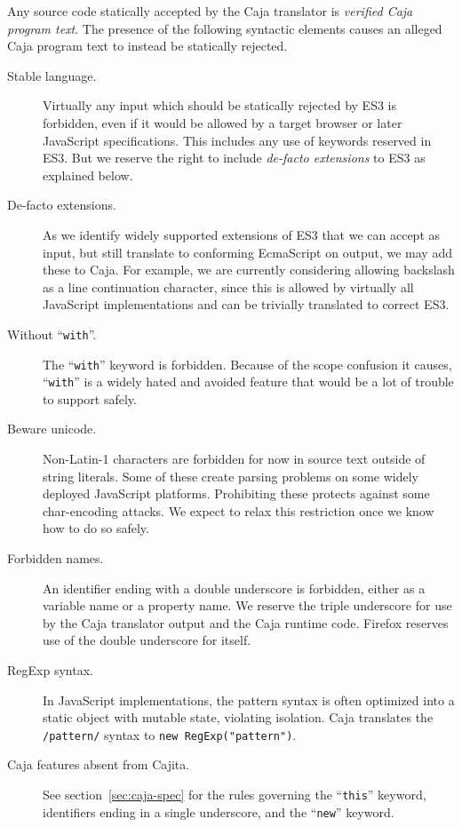 \documentclass[letterpaper,twocolumn,10pt]{article}
\newcommand{\code}[1]{{\tt {#1}}}              %
\begin{document}
Any source code statically accepted by the Caja translator is \emph{verified 
Caja program text}. The presence of the following syntactic elements causes 
an alleged Caja program text to instead be statically rejected.

\begin{description}

    \item[Stable language.] Virtually any input which should be statically 
    rejected by ES3 is forbidden, even if it would be allowed by a target 
    browser or later JavaScript specifications. This includes any use of 
    keywords reserved in ES3. But we reserve the right to include 
    \emph{de-facto extensions} to ES3 as explained below.
    
    \item[De-facto extensions.] As we identify widely supported extensions of 
    ES3 that we can accept as input, but still translate to conforming 
    EcmaScript on output, we may add these to Caja. For example, we are 
    currently considering allowing backslash as a line continuation 
    character, since this is allowed by virtually all JavaScript 
    implementations and can be trivially translated to correct ES3.

    \item[Without ``\code{with}''.] The ``\code{with}'' keyword is forbidden. 
    Because of the scope confusion it causes, ``\code{with}'' is a widely 
    hated and avoided feature that would be a lot of trouble to support 
    safely.

    \item[Beware unicode.] Non-Latin-1 characters are forbidden for now in 
    source text outside of string literals. Some of these create parsing 
    problems on some widely deployed JavaScript platforms. Prohibiting these 
    protects against some char-encoding attacks. We expect to relax this 
    restriction once we know how to do so safely.

    \item[Forbidden names.] An identifier ending with a double underscore is 
    forbidden, either as a variable name or a property name. We reserve the 
    triple underscore for use by the Caja translator output and the Caja 
    runtime code. Firefox reserves use of the double underscore for itself.
    
    \item[RegExp syntax.] In JavaScript implementations, the pattern syntax 
    is often optimized into a static object with mutable state, violating 
    isolation. Caja translates the \code{/pattern/} syntax to \code{new 
    RegExp("pattern")}.
    
    \item[Caja features absent from Cajita.] See section~\ref{sec:caja-spec} 
    for the rules governing the ``\code{this}'' keyword, identifiers ending 
    in a single underscore, and the ``\code{new}'' keyword.
        
\end{description}
\end{document}
